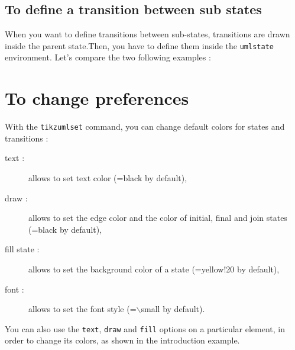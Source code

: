 \documentclass[a4paper,11pt]{report}
\newcommand{\inputTikZ}[1]{%
  }%
\newcommand{\inputTikZ}[1]{%
    \texttt{[image: fig/\#1.pdf]}%
  }%
\begin{document}
\subsection{To define a transition between sub states}\label{ss.substatetrans}

When you want to define transitions between sub-states, transitions are drawn inside the parent state.Then, you have to define them inside the {\tt umlstate} environment. Let's compare the two following examples :

\medskip

\begin{minipage}{0.51\textwidth}

\end{minipage}
\begin{minipage}{0.49\textwidth}
\begin{center}
\inputTikZ{transitioninnerbug}
\end{center}
\end{minipage}

\begin{minipage}{0.51\textwidth}

\end{minipage}
\begin{minipage}{0.49\textwidth}
\begin{center}
\inputTikZ{transitioninner}
\end{center}
\end{minipage}

\section{To change preferences}\label{s.fitstatetrans}

With the {\tt tikzumlset} command, you can change default colors for states and transitions :

\begin{description}
\item[text :] allows to set text color (=black by default),
\item[draw :] allows to set the edge color and the color of initial, final and join states (=black by default),
\item[fill state :] allows to set the background color of a state (=yellow!20 by default),
\item[font :] allows to set the font style (=$\backslash$small by default).
\end{description}

You can also use the {\tt text}, {\tt draw} and {\tt fill} options on a particular element, in order to change its colors, as shown in the introduction example.
\end{document}

